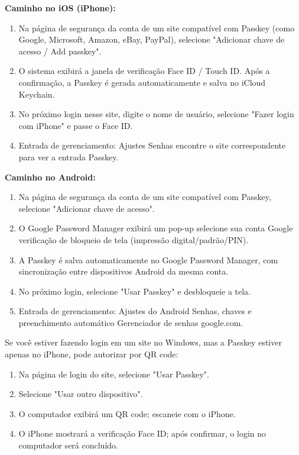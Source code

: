 
\textbf{Caminho no iOS (iPhone):}

\begin{enumerate}
  \item Na página de segurança da conta de um site compatível com Passkey (como Google, Microsoft, Amazon, eBay, PayPal), selecione "Adicionar chave de acesso / Add passkey".
  \item O sistema exibirá a janela de verificação Face ID / Touch ID. Após a confirmação, a Passkey é gerada automaticamente e salva no iCloud Keychain.
  \item No próximo login nesse site, digite o nome de usuário, selecione "Fazer login com iPhone" e passe o Face ID.
  \item Entrada de gerenciamento: Ajustes Senhas encontre o site correspondente para ver a entrada Passkey.
\end{enumerate}

\textbf{Caminho no Android:}

\begin{enumerate}
  \item Na página de segurança da conta de um site compatível com Passkey, selecione "Adicionar chave de acesso".
  \item O Google Password Manager exibirá um pop-up selecione sua conta Google verificação de bloqueio de tela (impressão digital/padrão/PIN).
  \item A Passkey é salva automaticamente no Google Password Manager, com sincronização entre dispositivos Android da mesma conta.
  \item No próximo login, selecione "Usar Passkey" e desbloqueie a tela.
  \item Entrada de gerenciamento: Ajustes do Android Senhas, chaves e preenchimento automático Gerenciador de senhas google.com.
\end{enumerate}


Se você estiver fazendo login em um site no Windows, mas a Passkey estiver apenas no iPhone, pode autorizar por QR code:

\begin{enumerate}
  \item Na página de login do site, selecione "Usar Passkey".
  \item Selecione "Usar outro dispositivo".
  \item O computador exibirá um QR code; escaneie com o iPhone.
  \item O iPhone mostrará a verificação Face ID; após confirmar, o login no computador será concluído.
\end{enumerate}

